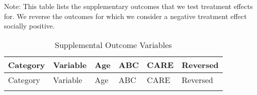 

\begin{center}
\begin{ThreePartTable}

\begin{TableNotes}
Note: This table lists the supplementary outcomes that we test treatment effects for. We reverse the outcomes for which we consider a negative treatment effect socially positive.
\end{TableNotes}


\begin{longtable}{L{4cm} L{5cm} C{1cm} C{1cm} C{1.2cm} C{1.5cm}}

\caption{Supplemental Outcome Variables}\label{tab:suppl-outcomes}  \\

\toprule
Category	&	Variable	&	Age	&	ABC	&	CARE	&	Reversed	\\ \midrule
\endfirsthead

\toprule
Category	&	Variable	&	Age	&	ABC	&	CARE	&	Reversed	\\ \midrule
\endhead

\midrule
\endfoot

\endlastfoot


\end{longtable}
\end{ThreePartTable}
\end{center}
